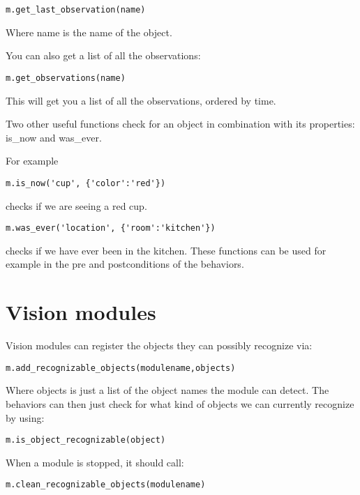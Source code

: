 \documentclass[a4paper, 10pt, oneside]{article}
\begin{document}
\begin{lstlisting}
m.get_last_observation(name)
\end{lstlisting}

Where name is the name of the object.

You can also get a list of all the observations:

\begin{lstlisting}
m.get_observations(name)
\end{lstlisting}

This will get you a list of all the observations, ordered by time.

Two other useful functions check for an object in combination with its properties: is\_now and was\_ever.

For example

\begin{lstlisting}
m.is_now('cup', {'color':'red'})
\end{lstlisting}

checks if we are seeing a red cup.

\begin{lstlisting}
m.was_ever('location', {'room':'kitchen'})
\end{lstlisting}

checks if we have ever been in the kitchen. These functions can be used for example in the pre and postconditions of the behaviors.




\section{Vision modules}

Vision modules can register the objects they can possibly recognize via:

\begin{lstlisting}
m.add_recognizable_objects(modulename,objects)
\end{lstlisting}

Where objects is just a list of the object names the module can detect. The behaviors can then just check for what kind of objects
we can currently recognize by using:

\begin{lstlisting}
m.is_object_recognizable(object)
\end{lstlisting}

When a module is stopped, it should call:

\begin{lstlisting}
m.clean_recognizable_objects(modulename)
\end{lstlisting}
\end{document}
